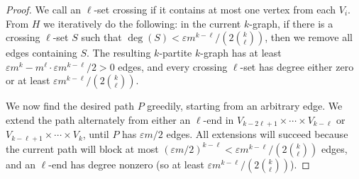 \documentclass[11pt, reqno]{amsart}    	%
\theoremstyle{definition}
\numberwithin{equation}{section}
\begin{document}
	\begin{proof}
		We call an $\ell$-set crossing if it contains at most one vertex from each $V_i$.
		From $H$ we iteratively do the following: in the current $k$-graph, if there is a crossing $\ell$-set $S$ such that $\deg(S)<\varepsilon m^{k-\ell}/(2\binom{k}{\ell})$, then we remove all edges containing $S$.
		The resulting $k$-partite $k$-graph has at least $\varepsilon m^k - m^\ell\cdot \varepsilon m^{k-\ell}/2>0$ edges, and every crossing $\ell$-set has degree either zero or at least $\varepsilon m^{k-\ell}/(2\binom{k}{\ell})$.
		
		We now find the desired path $P$ greedily, starting from an arbitrary edge.
		We extend the path alternately from either an $\ell$-end in $V_{k-2\ell+1}\times \cdots\times V_{k-\ell}$ or $V_{k-\ell+1}\times \cdots\times V_{k}$, until $P$ has $\varepsilon m/2$ edges.
		All extensions will succeed because the current path will block at most $(\varepsilon m/2)^{k-\ell} < \varepsilon m^{k-\ell}/(2\binom{k}{\ell})$ edges, and an $\ell$-end has degree nonzero (so at least $\varepsilon m^{k-\ell}/(2\binom{k}{\ell})$).
	\end{proof}
	
\end{document}

